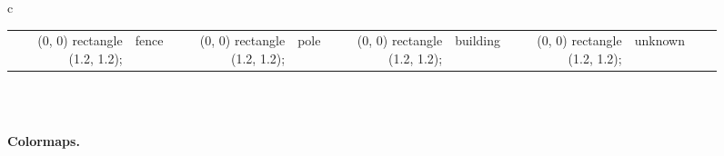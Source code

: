 \begin{figure*}[!b]
\begin{tabular}{c}
\begin{tabular}{rlrlrlrlrl}
            \tikz \fill[fill=tempcolor, scale=0.3, draw=black] (0, 0) rectangle (1.2, 1.2); 
            & \small{fence}
            &
            \definecolor{tempcolor}{rgb}{0.94,  0.45, 0.}
            \tikz \fill[fill=tempcolor, scale=0.3, draw=black] (0, 0) rectangle (1.2, 1.2); 
            & \small{pole}
            &
            \definecolor{tempcolor}{rgb}{0.84, 0.26, 0.21}
            \tikz \fill[fill=tempcolor, scale=0.3, draw=black] (0, 0) rectangle (1.2, 1.2);
            & \small{building}
            &
            \definecolor{tempcolor}{rgb}{0., 0.03, 0.45}
            \tikz \fill[fill=tempcolor, scale=0.3, draw=black] (0, 0) rectangle (1.2, 1.2);
            & \small{unknown}
            
        \end{tabular}\\
        \midrule~\\
    \end{tabular}
    \caption{{\bf Colormaps.} }
    \label{fig:colormaps}
\end{figure*} 
